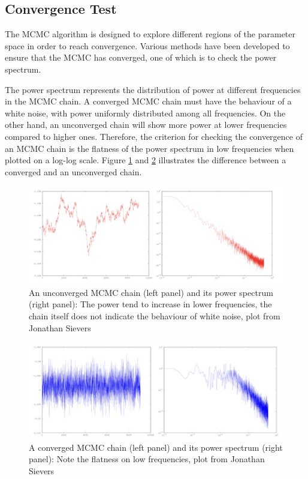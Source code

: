 \documentclass[12pt, TexShade, letterpaper]{report}
\begin{document}
\subsection{Convergence Test}
The MCMC algorithm is designed to explore different regions of the parameter space in order to reach convergence. Various methods have been developed to ensure that the MCMC has converged, one of which is to check the power spectrum.\par
The power spectrum represents the distribution of power at different frequencies in the MCMC chain. A converged MCMC chain must have the behaviour of a white noise, with power uniformly distributed among all frequencies. On the other hand, an unconverged chain will show more power at lower frequencies compared to higher ones. Therefore, the criterion for checking the convergence of an MCMC chain is the flatness of the power spectrum in low frequencies when plotted on a log-log scale. Figure \ref{fig:MCMC_unconverged} and \ref{fig:MCMC_converged} illustrates the difference between a converged and an unconverged chain.\par
\begin{figure}[h!]
\centering
\includegraphics[scale =0.9]{mcmc_uncoverged.jpg}
\caption{An unconverged MCMC chain (left panel) and its power spectrum (right panel): The power tend to increase in lower frequencies, the chain itself does not indicate the behaviour of white noise, plot from Jonathan Sievers}
\label{fig:MCMC_unconverged}
\end{figure}

\begin{figure}[h!]
\centering
\includegraphics[scale =0.9]{mcmc_converged.jpg}
\caption{A converged MCMC chain (left panel) and its power spectrum (right panel): Note the flatness on low frequencies, plot from Jonathan Sievers}
\label{fig:MCMC_converged}
\end{figure}
\end{document}
